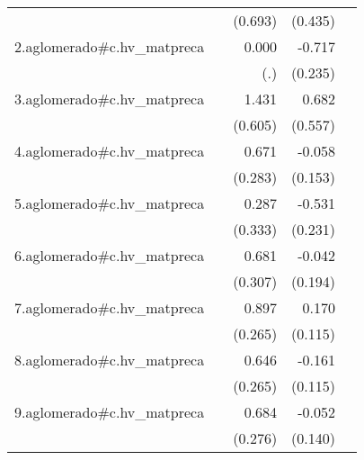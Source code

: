 {\begin{longtable}{l*{4}{D{.}{.}{-1}}}
            &                     &     (0.693)         &     (0.435)         &                     \\
\addlinespace
2.aglomerado#c.hv\_matpreca&                     &       0.000         &      -0.717\sym{**} &                     \\
            &                     &         (.)         &     (0.235)         &                     \\
\addlinespace
3.aglomerado#c.hv\_matpreca&                     &       1.431\sym{*}  &       0.682         &                     \\
            &                     &     (0.605)         &     (0.557)         &                     \\
\addlinespace
4.aglomerado#c.hv\_matpreca&                     &       0.671\sym{*}  &      -0.058         &                     \\
            &                     &     (0.283)         &     (0.153)         &                     \\
\addlinespace
5.aglomerado#c.hv\_matpreca&                     &       0.287         &      -0.531\sym{*}  &                     \\
            &                     &     (0.333)         &     (0.231)         &                     \\
\addlinespace
6.aglomerado#c.hv\_matpreca&                     &       0.681\sym{*}  &      -0.042         &                     \\
            &                     &     (0.307)         &     (0.194)         &                     \\
\addlinespace
7.aglomerado#c.hv\_matpreca&                     &       0.897\sym{***}&       0.170         &                     \\
            &                     &     (0.265)         &     (0.115)         &                     \\
\addlinespace
8.aglomerado#c.hv\_matpreca&                     &       0.646\sym{*}  &      -0.161         &                     \\
            &                     &     (0.265)         &     (0.115)         &                     \\
\addlinespace
9.aglomerado#c.hv\_matpreca&                     &       0.684\sym{*}  &      -0.052         &                     \\
            &                     &     (0.276)         &     (0.140)         &                     \\

\end{longtable}}
